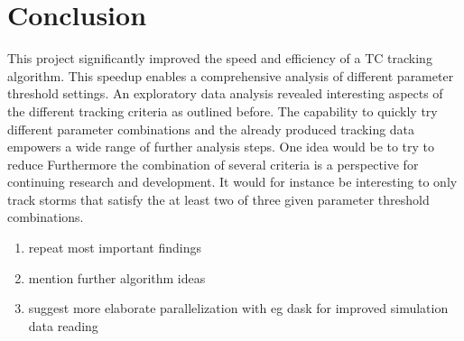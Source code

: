 \chapter{Conclusion}\label{sec:conclusion}
This project significantly improved the speed and efficiency of a TC tracking algorithm. This speedup enables a comprehensive analysis of different parameter threshold settings. An exploratory data analysis revealed interesting aspects of the different tracking criteria as outlined before. The capability to quickly try different parameter combinations and the already produced tracking data empowers a wide range of further analysis steps. One idea would be to try to reduce \newline
Furthermore the combination of several criteria is a perspective for continuing research and development. It would for instance be interesting to only track storms that satisfy the at least two of three given parameter threshold combinations.

\begin{enumerate}
    \item repeat most important findings
    \item mention further algorithm ideas
    \item suggest more elaborate parallelization with eg dask for improved simulation data reading
\end{enumerate}